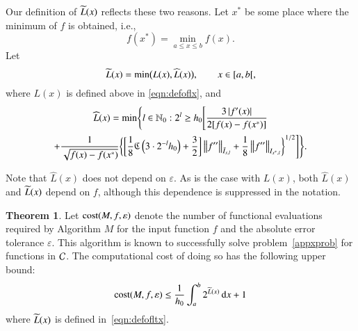\documentclass[review]{elsarticle}
\newcommand{\abstol}{\varepsilon}
\theoremstyle{definition}
\newcommand{\chL}{\widehat{L}}
\newtheorem{theorem}{Theorem}
\begin{document}
Our definition of $\widetilde{L}(x)$ reflects these two reasons.  Let $x^*$ be some place where the minimum of $f$ is obtained, i.e.,
\[
f(x^*)  = \min_{a \le x \le b} f(x).
\]
Let
\begin{equation}\label{eqn:defofltx}
\tL(x) = \min\bigl(L(x),\chL(x)\bigr), \qquad x \in [a,b[,
\end{equation}
where $L(x)$ is defined above in \eqref{eqn:defoflx}, and
\begin{multline}\label{eqn:defoflt1x}
\chL(x) = \min \Biggl\{ l \in \mathbb{N}_0 :  2^l \ge h_0 \Biggl[ \frac{3\abs{f'(x)}}{2[f(x) - f(x^*)]} \\
+  \frac{1}{\sqrt{f(x) - f(x^*)}} \biggl\{ \biggl[\frac 18 \fC\left(3\cdot2^{-l}h_0\right) + \frac 32 \biggr]   \norm[\bar{I}_{x,l}]{f''}
+ \frac18\norm[{I_{x^*,l}}]{f''} \biggr\}^{1/2} \Biggr] \Biggr\}.
\end{multline}

Note that $\chL(x)$ does not depend on $\abstol$.
As is the case with $L(x)$, both $\chL(x)$ and $\widetilde{L}(x)$  depend on $f$, although this dependence is suppressed in the notation.

\begin{theorem}\label{thm:Mcost}
	Let $\cost(M,f,\abstol)$ denote the number of functional evaluations required by Algorithm $M$ for the input function $f$ and the absolute error tolerance $\abstol$.  This algorithm is known to successfully solve problem~\eqref{appxprob} for functions in $\mathcal{C}$.  The computational cost of doing so has the following upper bound:
	\begin{equation*}
	\cost(M,f,\abstol) \le \frac{1}{h_0}\int_a^b 2^{\tL(x)} \, \dif x +1 \\
	\end{equation*}
	where $\widetilde{L}(x)$ is defined in~\eqref{eqn:defofltx}.
\end{theorem}
\end{document}
